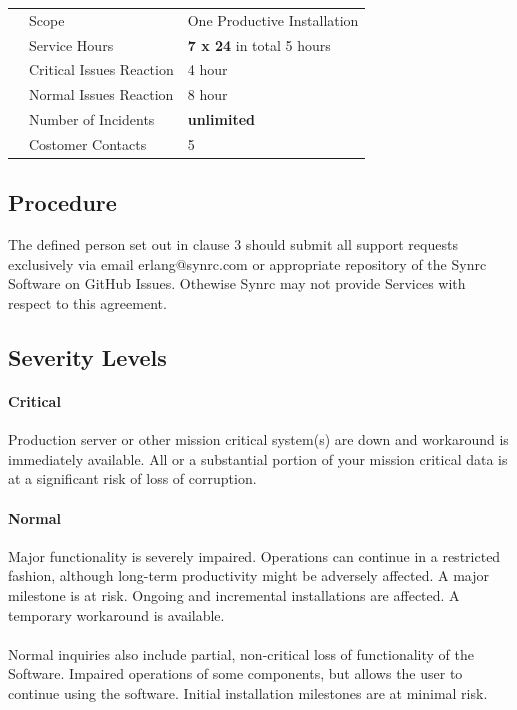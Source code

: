 \documentclass[11pt,oneside]{article}
\begin{document}
\begin{tabular}{lll}
        & Scope                    & One Productive Installation \\
        & Service Hours            & {\bf 7 x 24} in total 5 hours\\
        & Critical Issues Reaction & 4 hour \\
        & Normal Issues Reaction   & 8 hour \\
        & Number of Incidents      & {\bf unlimited} \\
        & Costomer Contacts        & 5 \\
\end{tabular}

\subsection*{Procedure}
The defined person set out in clause 3 should submit all support requests exclusively
via email erlang@synrc.com or appropriate repository of the Synrc Software on GitHub Issues.
Othewise Synrc may not provide Services with respect to this agreement.

\subsection*{Severity Levels}
\paragraph{{\bf Critical}}
Production server or other mission critical system(s) are down and workaround is
immediately available. All or a substantial portion of your mission critical data is
at a significant risk of loss of corruption.
\paragraph{{\bf Normal}}
Major functionality is severely impaired. Operations can continue in a restricted fashion,
although long-term productivity might be adversely affected. A major milestone is at risk.
Ongoing and incremental installations are affected. A temporary workaround is available.
\paragraph{}
Normal inquiries also include partial, non-critical loss of functionality of the Software.
Impaired operations of some components, but allows the user to continue using the software.
Initial installation milestones are at minimal risk.
\end{document}
